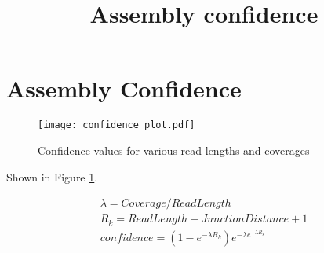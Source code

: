 \documentclass{article}
\title{Assembly confidence}
\begin{document}
\section{Assembly Confidence}


\begin{figure}[ht]
\centering
\texttt{[image: confidence\_plot.pdf]}
\caption{Confidence values for various read lengths and coverages}
\label{fig:contig_conf_values_plot}
\end{figure}

Shown in Figure \ref{fig:contig_conf_values_plot}.

\begin{gather*}
\lambda = Coverage / ReadLength \\
R_k = ReadLength - JunctionDistance + 1 \\
confidence = \left(1 - e^{-\lambda R_k}\right) e^{-\lambda e^{-\lambda R_k}}
\end{gather*}
\end{document}
